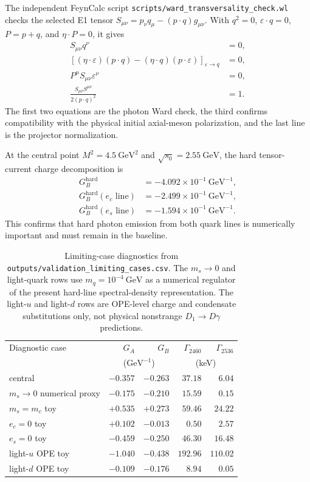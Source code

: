 \documentclass[11pt]{article}
\newcommand{\GeV}{\mathrm{GeV}}
\begin{document}
The independent FeynCalc script
\texttt{scripts/ward\_transversality\_check.wl} checks the selected E1 tensor
$S_{\mu\nu}=p_\nu q_\mu-(p\cdot q)g_{\mu\nu}$.  With
$q^2=0$, $\varepsilon\cdot q=0$, $P=p+q$, and $\eta\cdot P=0$, it gives
\begin{align}
  S_{\mu\nu}q^\nu &=0,\\
  \left[(\eta\cdot\varepsilon)(p\cdot q)
    -(\eta\cdot q)(p\cdot\varepsilon)\right]_{\varepsilon\to q}
  &=0,\\
  P^\mu S_{\mu\nu}\varepsilon^\nu&=0,\\
  \frac{S_{\mu\nu}S^{\mu\nu}}{2(p\cdot q)^2}&=1.
\end{align}
The first two equations are the photon Ward check, the third confirms
compatibility with the physical initial axial-meson polarization, and the last
line is the projector normalization.

At the central point $M^2=4.5~\GeV^2$ and
$\sqrt{s_0}=2.55~\GeV$, the hard tensor-current charge decomposition is
\begin{align}
  G_B^{\mathrm{hard}}&=-4.092\times10^{-1}~\GeV^{-1},\\
  G_B^{\mathrm{hard}}(e_c\text{ line})&=-2.499\times10^{-1}~\GeV^{-1},\\
  G_B^{\mathrm{hard}}(e_s\text{ line})&=-1.594\times10^{-1}~\GeV^{-1}.
\end{align}
This confirms that hard photon emission from both quark lines is numerically
important and must remain in the baseline.

\begin{table}[htbp]
  \centering
  \begin{tabular}{lrrrr}
    \toprule
    Diagnostic case & $G_A$ & $G_B$ & $\Gamma_{2460}$ & $\Gamma_{2536}$\\
    & \multicolumn{2}{c}{($\GeV^{-1}$)} & \multicolumn{2}{c}{(keV)}\\
    \midrule
    central & $-0.357$ & $-0.263$ & $37.18$ & $6.04$\\
    $m_s\to0$ numerical proxy & $-0.175$ & $-0.210$ & $15.59$ & $0.15$\\
    $m_s=m_c$ toy & $+0.535$ & $+0.273$ & $59.46$ & $24.22$\\
    $e_c=0$ toy & $+0.102$ & $-0.013$ & $0.50$ & $2.57$\\
    $e_s=0$ toy & $-0.459$ & $-0.250$ & $46.30$ & $16.48$\\
    light-$u$ OPE toy & $-1.040$ & $-0.438$ & $192.96$ & $110.02$\\
    light-$d$ OPE toy & $-0.109$ & $-0.176$ & $8.94$ & $0.05$\\
    \bottomrule
  \end{tabular}
  \caption{Limiting-case diagnostics from
  \texttt{outputs/validation\_limiting\_cases.csv}.  The $m_s\to0$ and
  light-quark rows use $m_q=10^{-4}~\GeV$ as a numerical regulator of the
  present hard-line spectral-density representation.  The light-$u$ and
  light-$d$ rows are OPE-level charge and condensate substitutions only, not
  physical nonstrange $D_1\to D\gamma$ predictions.}
  \label{tab:validation-limits}
\end{table}
\end{document}
